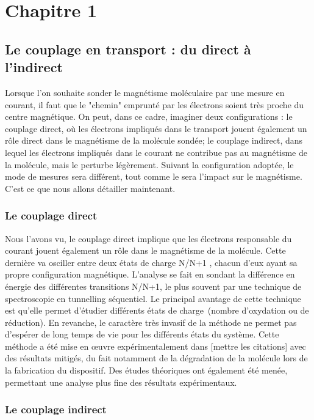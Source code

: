 \chapter{Chapitre 1}

\section{Le couplage en transport : du direct à l'indirect}

Lorsque l'on souhaite sonder le magnétisme moléculaire par une mesure en courant, il faut que le "chemin" emprunté par les électrons soient très proche du centre magnétique. On peut, dans ce cadre, imaginer deux configurations : le couplage direct, où les électrons impliqués dans le transport jouent également un rôle direct dans le magnétisme de la molécule sondée; le couplage indirect, dans lequel les électrons impliqués dans le courant ne contribue pas au magnétisme de la molécule, mais le perturbe légèrement. Suivant la configuration adoptée, le mode de mesures sera différent, tout comme le sera l'impact sur le magnétisme. C'est ce que nous allons détailler maintenant.

\subsection{Le couplage direct}
Nous l'avons vu, le couplage direct implique que les électrons responsable du courant jouent également un rôle dans le magnétisme de la molécule. Cette dernière va osciller entre deux états de charge N/N+1 , chacun d'eux ayant sa propre configuration magnétique. L'analyse se fait en sondant la différence en énergie des différentes transitions N/N+1, le plus souvent par une technique de spectroscopie en tunnelling séquentiel. Le principal avantage de cette technique est qu'elle permet d'étudier différents états de charge~(nombre d'oxydation ou de réduction). En revanche, le caractère très invasif de la méthode ne permet pas d'espérer de long temps de vie pour les différents états du système. Cette méthode a été mise en œuvre expérimentalement dans [mettre les citations] avec des résultats mitigés, du fait notamment de la dégradation de la molécule lors de la fabrication du dispositif. Des études théoriques ont également été menée, permettant une analyse plus fine des résultats expérimentaux.

\subsection{Le couplage indirect}

